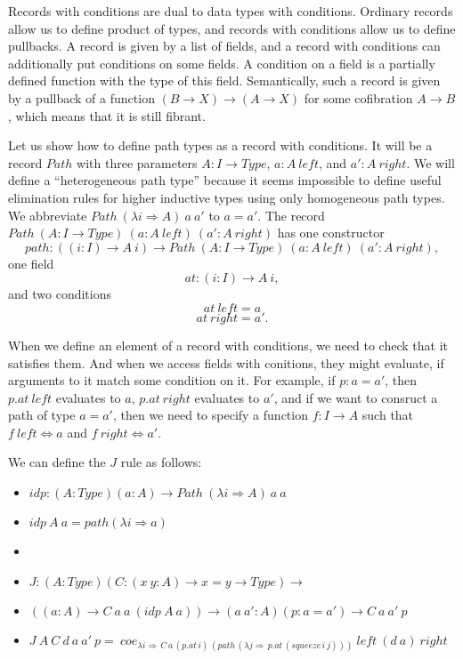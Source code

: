 \documentclass{amsart}
\theoremstyle{definition}
\theoremstyle{remark}
\newcommand{\red}{\Rightarrow}
\newcommand{\deq}{\Leftrightarrow}
\numberwithin{figure}{section}
\begin{document}
Records with conditions are dual to data types with conditions.
Ordinary records allow us to define product of types, and records with conditions allow us to define pullbacks.
A record is given by a list of fields, and a record with conditions can additionally put conditions on some fields.
A condition on a field is a partially defined function with the type of this field.
Semantically, such a record is given by a pullback of a function $(B \to X) \to (A \to X)$ for some cofibration $A \to B$, which means that it is still fibrant.

Let us show how to define path types as a record with conditions.
It will be a record $Path$ with three parameters $A : I \to Type$, $a : A\ left$, and $a' : A\ right$.
We will define a ``heterogeneous path type'' because it seems impossible to define useful elimination rules for higher inductive types using only homogeneous path types.
We abbreviate $Path\ (\lambda i \red A)\ a\ a'$ to $a = a'$.
The record $Path\ (A : I \to Type)\ (a : A\ left)\ (a' : A\ right)$ has one constructor
\[ path : ((i : I) \to A\ i) \to Path\ (A : I \to Type)\ (a : A\ left)\ (a' : A\ right), \]
one field
\[ at : (i : I) \to A\ i, \]
and two conditions
\[ at\ left = a \]
\[ at\ right = a'. \]

When we define an element of a record with conditions, we need to check that it satisfies them.
And when we access fields with conitions, they might evaluate, if arguments to it match some condition on it.
For example, if $p : a = a'$, then $p.at\ left$ evaluates to $a$, $p.at\ right$ evaluates to $a'$,
and if we want to consruct a path of type $a = a'$, then we need to specify a function $f : I \to A$ such that $f\ left \deq a$ and $f\ right \deq a'$.

We can define the $J$ rule as follows:
\begin{itemize}
\item[] $idp : (A : Type) (a : A) \to Path\ (\lambda i \red A)\ a\ a$
\item[] $idp\ A\ a = path (\lambda i \red a)$
\item[]
\item[] $J : (A : Type) (C : (x\ y : A) \to x = y \to Type) \to$
\item[] \qquad $((a : A) \to C\ a\ a\ (idp\ A\ a)) \to (a\ a' : A) (p : a = a') \to C\ a\ a'\ p$
\item[] $J\ A\ C\ d\ a\ a'\ p =\ coe_{\lambda i \red \,C\,a\,(p.at\,i)\,(path\,(\lambda j \red \,p.at\,(squeeze\,i\,j)))}\ left\ (d\ a)\ right$
\end{itemize}
\end{document}
